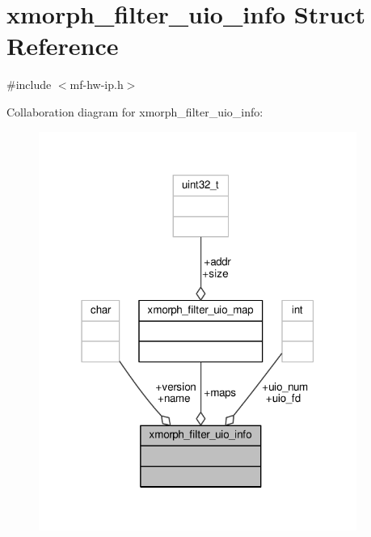\hypertarget{structxmorph__filter__uio__info}{}\section{xmorph\+\_\+filter\+\_\+uio\+\_\+info Struct Reference}
\label{structxmorph__filter__uio__info}


{\ttfamily \#include $<$mf-\/hw-\/ip.\+h$>$}



Collaboration diagram for xmorph\+\_\+filter\+\_\+uio\+\_\+info\+:
\nopagebreak
\begin{figure}[H]
\begin{center}
\leavevmode
\includegraphics[width=295pt]{structxmorph__filter__uio__info__coll__graph}
\end{center}
\end{figure}
